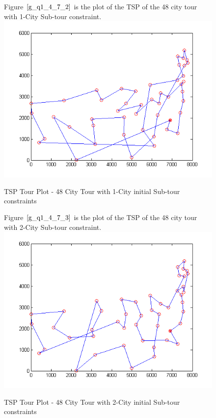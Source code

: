 \documentclass[twoside,12pt]{article}
\begin{document}
\begin{figure}[!htbp]
\centering
Figure $\eqref{g_q1_4_7_2}$ is the plot of the TSP of the 48 city tour with 1-City Sub-tour constraint. 
 \includegraphics[scale=1.3]{1_city/all_48_with_1} 
\caption{TSP Tour Plot - 48 City Tour with 1-City initial Sub-tour constraints}
\label{g_q1_4_7_2}
\end{figure}
\FloatBarrier

\begin{figure}[!htbp]
\centering
Figure $\eqref{g_q1_4_7_3}$ is the plot of the TSP of the 48 city tour with 2-City Sub-tour constraint. 
 \includegraphics[scale=1.3]{2_city/all_48_with_2} 
\caption{TSP Tour Plot - 48 City Tour with 2-City initial Sub-tour constraints}
\label{g_q1_4_7_3}
\end{figure}
\FloatBarrier
\end{document}
